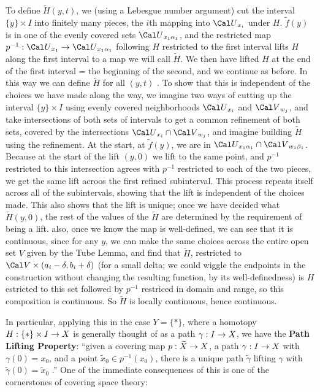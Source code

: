 To define $\widetilde{H}(y,t)$, we (using a Lebesgue number argument) cut the
interval $\{y\}\times I$ into finitely many pieces, the $i$th mapping into 
 ${\Cal U}_{x_i}$ under $H$. $\widetilde{f}(y)$ is in one of the evenly covered
sets ${\Cal U}_{x_1\alpha_1}$, and the restricted map 
$p^{-1}:{\Cal U}_{x_1}\ra {\Cal U}_{x_1\alpha_1}$ following $H$ restricted
to the first interval lifts $H$ along the first interval to a map 
we will call $\widetilde{H}$. We then have 
lifted $H$ at the end of the first interval = the beginning of the second, 
and we continue as before. In this way we can define $\widetilde{H}$ for all
$(y,t)$ . To show that this is independent of the choices we have
made along the way, we imagine two ways of cutting up the interval 
$\{y\}\times I$ using evenly covered neighborhoods ${\Cal U}_{x_i}$
and ${\Cal V}_{w_j}$, and take intersections of both sets of intervals
to get a common refinement of both sets, covered by the intersections
${\Cal U}_{x_i}\cap {\Cal V}_{w_j}$, and imagine building $\widetilde{H}$ using
the refinement. At the start, at $\widetilde{f}(y)$, we are in 
${\Cal U}_{x_1\alpha_1}\cap {\Cal V}_{w_1\beta_1}$. Because at the 
start of the lift $(y,0)$ we lift to the same point, and $p^{-1}$ restricted 
to this intersection agrees with $p^{-1}$ restricted to each of the two
pieces, we get the same lift acroos the first refined subinterval. This
process repeats itself across all of the subintervals, showing that
the lift is independent of the choices made. This also shows that
the lift is unique; once we have decided what $\widetilde{H}(y,0)$, the
rest of the values of the $\widetilde{H}$ are determined by the requirement
of being a lift. also, once we know the map is well-defined, we can see
that it is continuous, since for any $y$, we can make the same choices
across the entire open set $V$ given by the Tube Lemma, and find
that $\widetilde{H}$, restricted to ${\Cal V}\times(a_i-\delta,b_i+\delta)$
(for a small delta; we could wiggle the endpoints in the construction
without changing the resulting function, by its well-definedness)
is $H$ estricted to this set followed by $p^{-1}$ restriced in domain 
and range, so this composition is continuous. So $\widetilde{H}$
is locally continuous, hence continuous.

\bsk

 In particular, applying this in the case $Y=\{*\}$, where a homotopy
$H:\{*\}\times I\rightarrow X$ is generally thought of as a path $\gamma:I\rightarrow X$,
we have the {\bf Path Lifting Property}: ``given 
a covering map $p:\widetilde{X}\rightarrow X$, a path 
$\gamma:I\rightarrow X$ with $\gamma(0)=x_0$, and a point 
$\widetilde{x}_0\in p^{-1}(x_0)$, there is a unique path $\widetilde{\gamma}$
lifting $\gamma$ with $\widetilde{\gamma}(0)=\widetilde{x}_0$ .'' One of the 
immediate consequences of this is one of the cornerstones of covering space
theory:

